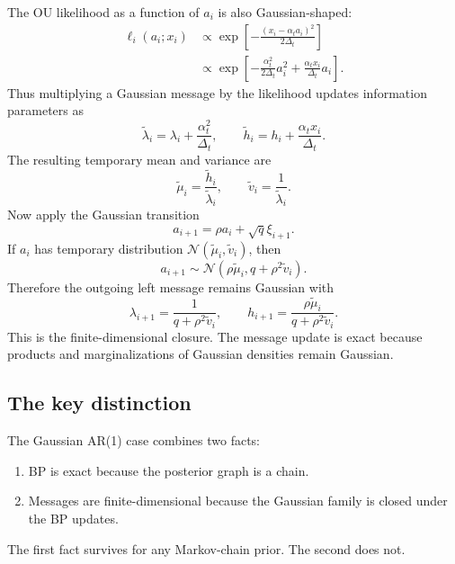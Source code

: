 \documentclass[11pt]{article}
\newcommand{\Normal}{\mathcal{N}}
\begin{document}
The OU likelihood as a function of \(a_i\) is also Gaussian-shaped:
\begin{align}
  \ell_i(a_i;x_i)
  &\propto
  \exp\left[-\frac{(x_i-\alpha_t a_i)^2}{2\Delta_t}\right]\\
  &\propto
  \exp\left[-\frac{\alpha_t^2}{2\Delta_t}a_i^2
  +\frac{\alpha_t x_i}{\Delta_t}a_i\right].
\end{align}
Thus multiplying a Gaussian message by the likelihood updates information parameters as
\begin{equation}
  \widetilde\lambda_i=\lambda_i+\frac{\alpha_t^2}{\Delta_t},
  \qquad
  \widetilde h_i=h_i+\frac{\alpha_t x_i}{\Delta_t}.
\end{equation}
The resulting temporary mean and variance are
\begin{equation}
  \widetilde\mu_i=\frac{\widetilde h_i}{\widetilde\lambda_i},
  \qquad
  \widetilde v_i=\frac{1}{\widetilde\lambda_i}.
\end{equation}
Now apply the Gaussian transition
\begin{equation}
  a_{i+1}=\rho a_i+\sqrt q\xi_{i+1}.
\end{equation}
If \(a_i\) has temporary distribution \(\Normal(\widetilde\mu_i,\widetilde v_i)\), then
\begin{equation}
  a_{i+1}\sim\Normal(\rho\widetilde\mu_i, q+\rho^2\widetilde v_i).
\end{equation}
Therefore the outgoing left message remains Gaussian with
\begin{equation}
  \lambda_{i+1}=\frac{1}{q+\rho^2\widetilde v_i},
  \qquad
  h_{i+1}=\frac{\rho\widetilde\mu_i}{q+\rho^2\widetilde v_i}.
\end{equation}
This is the finite-dimensional closure. The message update is exact because products and marginalizations of Gaussian densities remain Gaussian.

\subsection{The key distinction}

The Gaussian AR(1) case combines two facts:
\begin{enumerate}[label=\arabic*.]
  \item BP is exact because the posterior graph is a chain.
  \item Messages are finite-dimensional because the Gaussian family is closed under the BP updates.
\end{enumerate}
The first fact survives for any Markov-chain prior. The second does not.
\end{document}

